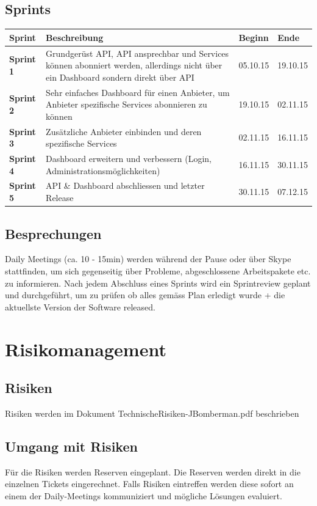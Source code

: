 \documentclass[11pt]{scrartcl}
\begin{document}
\subsection{Sprints}
\begin{tabularx}{\textwidth}{l X l l}
\textbf{Sprint} & \textbf{Beschreibung} & \textbf{Beginn} &  \textbf{Ende} \\
\hline
\textbf{Sprint 1} & Grundgerüst API, API ansprechbar und Services können 
abonniert werden, allerdings nicht über ein Dashboard sondern direkt über API  & 05.10.15 & 19.10.15 \\
\hline
\textbf{Sprint 2} & Sehr einfaches Dashboard für einen Anbieter, 
um Anbieter spezifische Services abonnieren zu können 
& 19.10.15 & 02.11.15 \\
\hline
\textbf{Sprint 3} & Zusätzliche Anbieter einbinden und deren spezifische Services  & 02.11.15 & 16.11.15 \\
\hline
\textbf{Sprint 4} & Dashboard erweitern und verbessern (Login, Administrationsmöglichkeiten) 
& 16.11.15 & 30.11.15 \\
\hline
\textbf{Sprint 5} & API \& Dashboard abschliessen und letzter Release  & 30.11.15 & 07.12.15 \\
\end{tabularx}

\subsection{Besprechungen}
Daily Meetings (ca. 10 - 15min) werden während der Pause oder über Skype stattfinden, um sich 
gegenseitig über Probleme, abgeschlossene Arbeitspakete etc. zu informieren.
Nach jedem Abschluss eines Sprints wird ein Sprintreview geplant und durchgeführt, um zu prüfen 
ob alles gemäss Plan erledigt wurde + die aktuellste Version der Software 
released.
\section{Risikomanagement}
\subsection{Risiken}
Risiken werden im Dokument TechnischeRisiken-JBomberman.pdf beschrieben
\subsection{Umgang mit Risiken}
Für die Risiken werden Reserven eingeplant. Die Reserven werden direkt in die einzelnen Tickets 
eingerechnet. Falls Risiken eintreffen werden diese sofort an einem der Daily-Meetings kommuniziert 
und mögliche Lösungen evaluiert.
\end{document}

